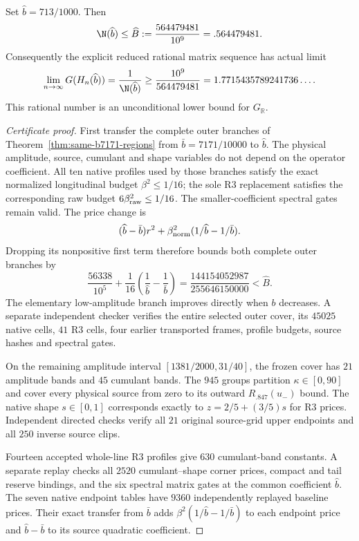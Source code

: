 \begin{theorem}
\label{thm:final-preferred-polygon}
Set $\widehat b=713/1000$. Then
\[
 \N(\widehat b)\le\widehat B:=\frac{564479481}{10^9}=.564479481.
\]
Consequently the explicit reduced rational matrix sequence has actual limit
\[
 \lim_{n\to\infty}G(H_n(\widehat b))
 =\frac1{\N(\widehat b)}
 \ge\frac{10^9}{564479481}
 =1.7715435789241736\ldots .
\]
This rational number is an unconditional lower bound for $G_{\mathbb R}$.
\end{theorem}
\begin{proof}[Certificate proof]
First transfer the complete outer branches of
Theorem~\ref{thm:same-b7171-regions} from $\bar b=7171/10000$ to
$\widehat b$. The physical amplitude, source, cumulant and shape variables
do not depend on the operator coefficient. All ten native profiles used
by those branches satisfy the exact normalized longitudinal budget
$\beta^2\le1/16$; the sole R3 replacement satisfies the corresponding
raw budget $6\beta_{\rm raw}^2\le1/16$. The smaller-coefficient spectral
gates remain valid. The price change is
\[
 (\widehat b-\bar b)r^2+
 \beta_{\rm norm}^2(1/\widehat b-1/\bar b).
\]
Dropping its nonpositive first term therefore bounds both complete outer
branches by
\[
 \frac{56338}{10^5}+\frac1{16}
   \left(\frac1{\widehat b}-\frac1{\bar b}\right)
 =\frac{144154052987}{255646150000}
 <\widehat B.
\]
The elementary low-amplitude branch improves directly when $b$ decreases.
A separate independent checker verifies the entire selected outer cover,
its $45025$ native cells, $41$ R3 cells, four earlier transported frames,
profile budgets, source hashes and spectral gates.

On the remaining amplitude interval $[1381/2000,31/40]$, the frozen
cover has $21$ amplitude bands and $45$ cumulant bands. The $945$ groups
partition $\kappa\in[0,90]$ and cover every physical source from zero
to its outward $R_{.847}(u_-)$ bound. The native shape $s\in[0,1]$
corresponds exactly to $z=2/5+(3/5)s$ for R3 prices. Independent directed
checks verify all $21$ original source-grid upper endpoints and all
$250$ inverse source clips.

Fourteen accepted whole-line R3 profiles give $630$ cumulant-band
constants. A separate replay checks all $2520$ cumulant--shape corner
prices, compact and tail reserve bindings, and the six spectral matrix
gates at the common coefficient $\widehat b$. The seven native endpoint
tables have $9360$ independently replayed baseline prices. Their exact
transfer from $\bar b$ adds
$\beta^2(1/\widehat b-1/\bar b)$ to each endpoint price and
$\widehat b-\bar b$ to its source quadratic coefficient.


\end{proof}
